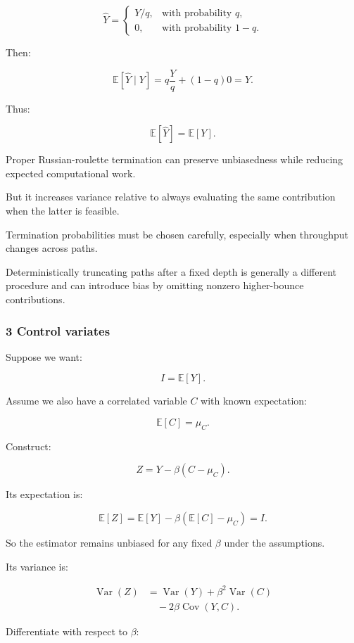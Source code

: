 \[
 \widehat Y= \begin{cases} Y/q,&\text{with probability }q,\\ 0,&\text{with probability }1-q. \end{cases}
\]

Then:

\[
 \mathbb E[\widehat Y\mid Y] = q\frac Yq+(1-q)0 =Y.
\]

Thus:

\[
 \boxed{ \mathbb E[\widehat Y]=\mathbb E[Y] }.
\]

Proper Russian-roulette termination can preserve unbiasedness while reducing expected computational work.

But it increases variance relative to always evaluating the same contribution when the latter is feasible.

Termination probabilities must be chosen carefully, especially when throughput changes across paths.

Deterministically truncating paths after a fixed depth is generally a different procedure and can introduce bias by omitting nonzero higher-bounce contributions.

\subsubsection{3 Control variates}\label{02-foundations-ii-ch031-control-variates}

Suppose we want:

\[
 I=\mathbb E[Y].
\]

Assume we also have a correlated variable \(C\) with known expectation:

\[
 \mathbb E[C]=\mu_C.
\]

Construct:

\[
 \boxed{ Z=Y-\beta(C-\mu_C) }.
\]

Its expectation is:

\[
 \mathbb E[Z] = \mathbb E[Y]-\beta(\mathbb E[C]-\mu_C) =I.
\]

So the estimator remains unbiased for any fixed \(\beta\) under the assumptions.

Its variance is:

\[
 \begin{aligned} \operatorname{Var}(Z) &= \operatorname{Var}(Y) +\beta^2\operatorname{Var}(C)\\ &\quad-2\beta\operatorname{Cov}(Y,C). \end{aligned}
\]

Differentiate with respect to \(\beta\):

